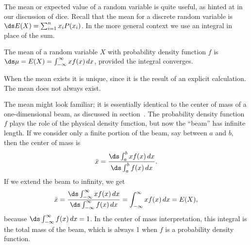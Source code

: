 

The mean or expected value of a random variable is quite useful, as
hinted at in our discussion of dice. Recall that the mean for a 
discrete random variable is $\ds E(X)=\sum_{i=1}^n x_iP(x_i)$. In the
more general context we use an integral in place of the sum.

\begin{definition} The {\dfont mean\/} 
of a random variable $X$ with probability density function $f$ is
$\ds \mu = E(X)=\int_{-\infty }^\infty xf(x)\,dx$,
provided the integral converges.
\end{definition}

When the mean exists it is unique, since it is the result of an
explicit calculation. The mean does not always exist.

The mean might look familiar; it is
essentially identical to the center of mass of a
one-dimensional beam, as discussed in section~.
The probability density function $f$ plays the role of the physical
density function, but now the ``beam'' has infinite length.
If we consider only a finite portion of the beam, say between $a$ and
$b$, then the center of mass is
$$\bar x = {\ds\int_a^b xf(x)\,dx\over\ds\int_a^b f(x)\,dx}.$$
If we extend the beam to infinity, we get
$$
  \bar x = {\ds\int_{-\infty}^\infty xf(x)\,dx\over
  \ds\int_{-\infty}^\infty f(x)\,dx} = \int_{-\infty}^\infty
  xf(x)\,dx = E(X),
$$
because $\ds \int_{-\infty}^\infty f(x)\,dx=1$. In the center of mass
interpretation, this integral is the total mass of the beam, which is
always 1 when $f$ is a probability density function.

